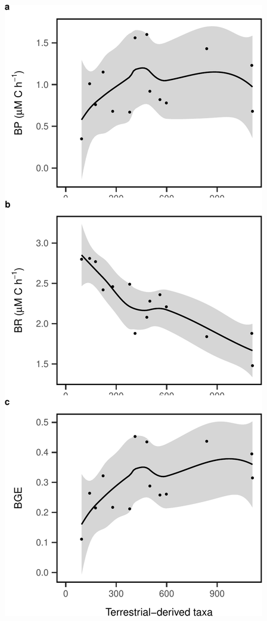 \documentclass[]{article}
\begin{document}
\begin{center}\includegraphics{ReservoirGradient_files/figure-latex/unnamed-chunk-12-1} \end{center}
\end{document}
